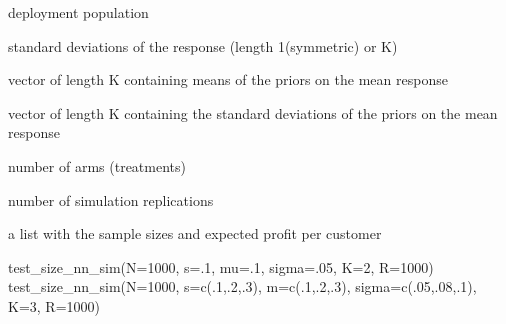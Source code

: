 \documentclass[a4paper]{book}
\begin{document}
\begin{Arguments}
\begin{ldescription}
\item[\code{N}] deployment population

\item[\code{s}] standard deviations of the response (length 1(symmetric) or K)

\item[\code{mu}] vector of length K containing means of the priors on the mean response

\item[\code{sigma}] vector of length K containing the standard deviations of the priors on the mean response

\item[\code{K}] number of arms (treatments)

\item[\code{R}] number of simulation replications
\end{ldescription}
\end{Arguments}
%
\begin{Value}
a list with the sample sizes and expected profit per customer
\end{Value}
%
\begin{Examples}
\begin{ExampleCode}
test_size_nn_sim(N=1000, s=.1, mu=.1, sigma=.05, K=2, R=1000)
test_size_nn_sim(N=1000, s=c(.1,.2,.3), m=c(.1,.2,.3), sigma=c(.05,.08,.1), K=3, R=1000)
\end{ExampleCode}
\end{Examples}
\printindex{}
\end{document}
